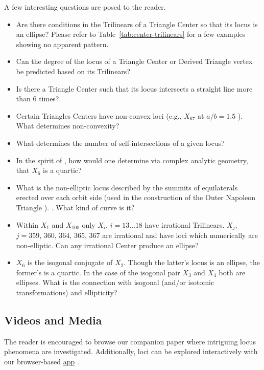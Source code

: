 A few interesting questions are posed to the reader.

\begin{itemize}
    \item Are there conditions in the Trilinears of a Triangle Center so that its locus is an ellipse? Please refer to
    Table~\ref{tab:center-trilinears} for a few examples showing no apparent pattern.
    \item Can the degree of the locus of a Triangle Center or Derived Triangle vertex be predicted based on its Trilinears?
    \item Is there a Triangle Center such that its locus intersects a straight line more than 6 times?
    \item Certain Triangles Centers have non-convex loci (e.g., $X_{67}$ at $a/b=1.5$ \cite{dsr_locus_gallery_2019}). What determines non-convexity?
    \item What determines the number of self-intersections of a given locus?
    \item In the spirit of \cite{corentin19,olga14}, how would one determine via complex analytic geometry, that $X_6$ is a quartic?
    \item What is the non-elliptic locus described by the summits of equilaterals erected over each orbit side (used in the construction of the Outer Napoleon Triangle \cite{mw}).  \cite[pl\#13]{dsr_playlist_2020}. What kind of curve is it?
    \item Within $X_1$ and $X_{100}$ only $X_i$, $i=13{\ldots}18$ have irrational Trilinears. $X_j$, $j=359,\,360,\,364,\,365,\,367$ are irrational and have loci which numerically are non-elliptic. Can any irrational Center produce an ellipse?
    \item $X_6$ is the isogonal conjugate of $X_2$. Though the latter's locus is an ellipse, the former's is a quartic. In the case of the isogonal pair $X_3$ and $X_4$ both are ellipses. What is the connection with isogonal (and/or isotomic transformations) and ellipticity?
\end{itemize}

\subsection{Videos and Media}

The reader is encouraged to browse our companion paper \cite{reznik2020-ballet} where intriguing locus phenomena are investigated. Additionally, loci can be explored interactively with our browser-based  \href{https://dan-reznik.github.io/ellipse-mounted-loci-p5js/}{app} \cite{darlan2020-ellipse-mounted}.

